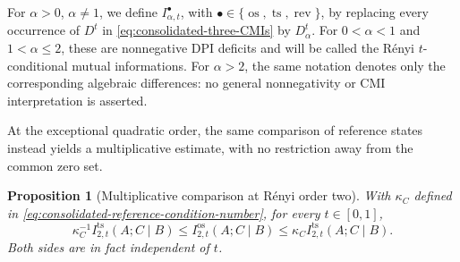\documentclass[11pt]{article}
\newtheorem{proposition}[proposition]{Proposition}
\theoremstyle{remark}
\DeclareMathOperator{\os}{os}
\DeclareMathOperator{\ts}{ts}
\DeclareMathOperator{\rev}{rev}
\newcommand{\1}{\mathbbm{1}}
\begin{document}
For $\alpha>0$, $\alpha\neq1$, we define
$I_{\alpha,t}^{\bullet}$, with
$\bullet\in\{\os,\ts,\rev\}$, by replacing every occurrence of
$D^t$ in \eqref{eq:consolidated-three-CMIs} by $D_\alpha^t$.
For $0<\alpha<1$ and $1<\alpha\leq2$, these are nonnegative DPI
deficits and will be called the R\'enyi $t$-conditional mutual
informations.  For $\alpha>2$, the same notation denotes only the
corresponding algebraic differences: no general nonnegativity or CMI
interpretation is asserted.

At the exceptional quadratic order, the same comparison of reference
states instead yields a multiplicative estimate, with no restriction
away from the common zero set.

\begin{proposition}[Multiplicative comparison at R\'enyi order two]
\label{prop:consolidated-quadratic-CMI-comparison}
With $\kappa_C$ defined in
\eqref{eq:consolidated-reference-condition-number}, for every
$t\in[0,1]$,
\begin{equation}
 \boxed{
 \kappa_C^{-1}I_{2,t}^{\ts}(A;C\mid B)
 \leq I_{2,t}^{\os}(A;C\mid B)
 \leq\kappa_C I_{2,t}^{\ts}(A;C\mid B).}
 \label{eq:consolidated-quadratic-CMI-comparison}
\end{equation}
Both sides are in fact independent of $t$.
\end{proposition}
\end{document}
